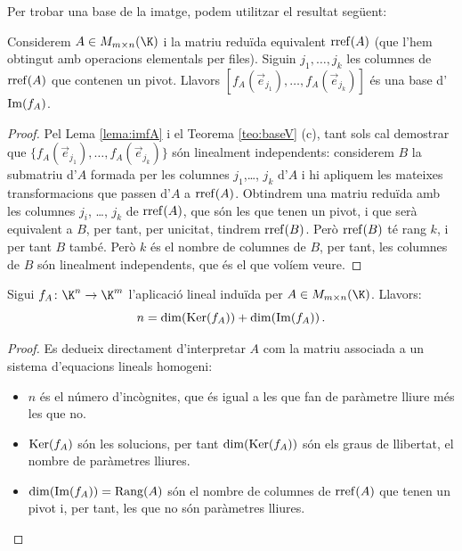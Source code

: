 Per trobar una base de la imatge, podem utilitzar el resultat següent:
\begin{proposicio}
    Considerem $A\in M_{m\times n}(\K)$ i la matriu reduïda equivalent $\operatorname{rref}(A)$ (que l'hem obtingut amb operacions elementals per files). Siguin $j_1, \dots , j_k$ les columnes de $\operatorname{rref}(A)$ que contenen un pivot. Llavors $[f_A(\vec e_{j_1}), \dots, f_A(\vec e_{j_k})]$ és una base d'$\operatorname{Im}(f_A)$.
\end{proposicio}
\begin{proof}
    Pel Lema \ref{lema:imfA} i el Teorema \ref{teo:baseV} (c), tant sols cal demostrar que $\{f_A(\vec e_{j_1}), \dots, f_A(\vec e_{j_k})\}$ són linealment independents: considerem $B$ la submatriu d'$A$ formada per les columnes $j_1$,\ldots, $j_k$ d'$A$ i hi apliquem les mateixes transformacions que passen d'$A$ a $\operatorname{rref}(A)$. Obtindrem una matriu reduïda amb les columnes $j_i$, \ldots, $j_k$ de $\operatorname{rref}(A)$, que són les que tenen un pivot, i que serà equivalent a $B$, per tant, per unicitat, tindrem $\operatorname{rref}(B)$. Però $\operatorname{rref}(B)$ té rang $k$, i per tant $B$ també. Però $k$ és el nombre de columnes de $B$, per tant, les columnes de $B$ són linealment independents, que és el que volíem veure. 
\end{proof}

\begin{teorema}\label{teo:ker+ima}
    Sigui $f_A\colon \K^n\to \K^m$ l'aplicació lineal induïda per $A\in M_{m\times n}(\K)$. Llavors:
    $$
    n=\dim(\operatorname{Ker}(f_A))+\dim(\operatorname{Im}(f_A)) \,.
    $$
\end{teorema}
\begin{proof}
    Es dedueix directament d'interpretar $A$ com la matriu associada a un sistema d'equacions lineals homogeni:
    \begin{itemize}
        \item $n$ és el número d'incògnites, que és igual a les que fan de paràmetre lliure més les que no. 
        \item $\operatorname{Ker}(f_A)$ són les solucions, per tant $\dim(\operatorname{Ker}(f_A))$ són els graus de llibertat, el nombre de paràmetres lliures.
        \item $\dim(\operatorname{Im}(f_A))=\operatorname{Rang}(A)$  són el nombre de columnes de $\operatorname{rref}(A)$ que tenen un pivot i, per tant, les que no són paràmetres lliures.
    \end{itemize}
\end{proof}

